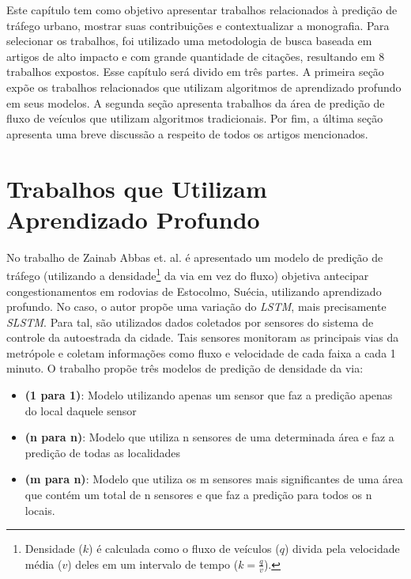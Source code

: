\label{chapter:trabalhos_relacionados}

Este capítulo tem como objetivo apresentar trabalhos relacionados à predição de tráfego urbano, mostrar suas contribuições e contextualizar a monografia. Para selecionar os trabalhos, foi utilizado uma metodologia de busca baseada em artigos de alto impacto e com grande quantidade de citações, resultando em 8 trabalhos expostos. Esse capítulo será divido em três partes. A primeira seção expõe os trabalhos relacionados que utilizam algoritmos de aprendizado profundo em seus modelos. A segunda seção apresenta trabalhos da área de predição de fluxo de veículos que utilizam algoritmos tradicionais. Por fim, a última seção apresenta uma breve discussão a respeito de todos os artigos mencionados. 

\section{Trabalhos que Utilizam Aprendizado Profundo}

No trabalho de Zainab Abbas et. al. \cite{Zainab_2018} é apresentado um modelo de predição de tráfego (utilizando a densidade\footnote{Densidade (\(k\)) é calculada como o fluxo de veículos (\(q\)) divida pela velocidade média (\(v\)) deles em um intervalo de tempo (\(k = \frac{q}{v} \)).} da via em vez do fluxo) objetiva antecipar congestionamentos em rodovias de Estocolmo, Suécia, utilizando aprendizado profundo. No caso, o autor propõe uma variação do \textit{\acrshort{LSTM}}, mais precisamente \textit{\acrfull{SLSTM}}. Para tal, são utilizados dados coletados por sensores do sistema de controle da autoestrada da cidade. Tais sensores monitoram as principais vias da metrópole e coletam informações como fluxo e velocidade de cada faixa a cada 1 minuto. O trabalho propõe três modelos de predição de densidade da via:

\begin{itemize}
    \item \textbf{(1 para 1)}: Modelo utilizando apenas um sensor que faz a predição apenas do local daquele sensor
    \item \textbf{(n para n)}: Modelo que utiliza n sensores de uma determinada área e faz a predição de todas as localidades
    \item \textbf{(m para n)}: Modelo que utiliza os m sensores mais significantes de uma área que contém um total de n sensores e que faz a predição para todos os n locais.
\end{itemize}

